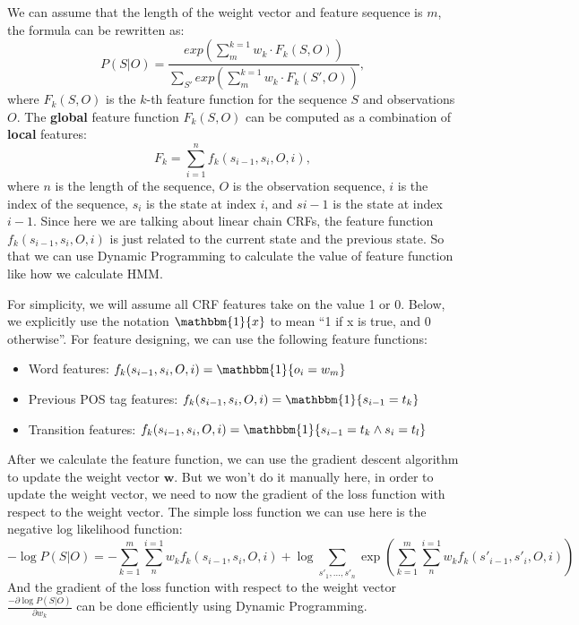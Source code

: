 \documentclass{article}
\begin{document}
We can assume that the length of the weight vector and feature sequence is $m$, 
the formula can be rewritten as:
$$P(S|O) = \frac{exp( {\textstyle \sum_{m}^{k=1} w_{k} \cdot F_{k}(S, O) })}{ {\textstyle \sum_{S'}^{}exp( {\textstyle \sum_{m}^{k=1} w_{k} \cdot F_{k}(S', O) })} },$$
where $F_{k}(S, O)$ is the $k$-th feature function for the sequence $S$ and observations $O$.
The \textbf{global} feature function $F_{k}(S, O)$ can be computed as a combination of \textbf{local} features:
$$F_{k} =  \sum_{i=1}^{n}f_{k}(s_{i-1}, s_{i}, O, i),$$
where $n$ is the length of the sequence, $O$ is the observation sequence, 
$i$ is the index of the sequence, $s_{i}$ is the state at index $i$, 
and $s{i-1}$ is the state at index $i-1$.
Since here we are talking about linear chain CRFs, 
the feature function $f_{k}(s_{i-1}, s_{i}, O, i)$ is just related to the current state 
and the previous state. So that we can use Dynamic Programming to calculate 
the value of feature function like how we calculate HMM.

For simplicity, we will assume all CRF features take on the value 1 or 0. 
Below, we
explicitly use the notation $\mathbbm{1}\{x\}$ to mean ``1 if x is true, and 0 otherwise''.
For feature designing, we can use the following feature functions:
\begin{itemize}
    \item Word features: $f_{k}(s_{i-1}, s_{i}, O, i) = \mathbbm{1}\{o_{i} = w_{m}\}$
    \item Previous POS tag features: $f_{k}(s_{i-1}, s_{i}, O, i) = \mathbbm{1}\{s_{i-1} = t_{k}\}$
    \item Transition features: $f_{k}(s_{i-1}, s_{i}, O, i) = \mathbbm{1}\{s_{i-1} = t_{k} \land s_{i} = t_{l}\}$
\end{itemize}

After we calculate the feature function, 
we can use the gradient descent algorithm to update the weight vector $\mathbf{w}$.
But we won't do it manually here, in order to update the weight vector,
we need to now the gradient of the loss function with respect to the weight vector.
The simple loss function we can use here is the negative log likelihood function:
$$-\log P(S|O) = -\sum_{k=1}^{m}\sum_{n}^{i=1}w_{k}f_{k}(s_{i-1},s_{i},O,i)+
\log \sum_{s'_{1}, 
\dots,s'_{n} }^{} \exp (\sum_{k=1}^{m}\sum_{n}^{i=1}w_{k}f_{k}(s'_{i-1},s'_{i},O,i))$$
And the gradient of the loss function with respect to the weight vector
$\frac{-\partial \log P(S|O)}{\partial w_{k}} $ can be done efficiently using Dynamic Programming.
\end{document}
